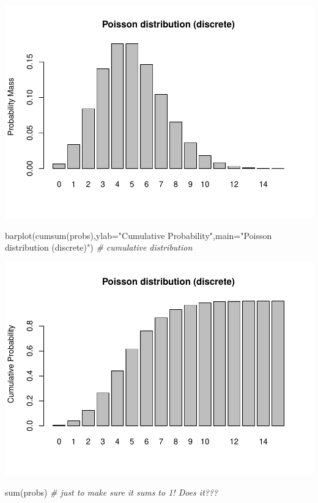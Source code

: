\documentclass[
]{article}
\newenvironment{Shaded}{\begin{snugshade}}{\end{snugshade}}
\newcommand{\AttributeTok}[1]{\textcolor[rgb]{0.77,0.63,0.00}{#1}}
\newcommand{\CommentTok}[1]{\textcolor[rgb]{0.56,0.35,0.01}{\textit{#1}}}
\newcommand{\FunctionTok}[1]{\textcolor[rgb]{0.00,0.00,0.00}{#1}}
\newcommand{\NormalTok}[1]{#1}
\newcommand{\StringTok}[1]{\textcolor[rgb]{0.31,0.60,0.02}{#1}}
\begin{document}
\includegraphics{LECTURE2_files/figure-latex/unnamed-chunk-13-1.pdf}

\begin{Shaded}
\begin{Highlighting}[]
\FunctionTok{barplot}\NormalTok{(}\FunctionTok{cumsum}\NormalTok{(probs),}\AttributeTok{ylab=}\StringTok{"Cumulative Probability"}\NormalTok{,}\AttributeTok{main=}\StringTok{"Poisson distribution (discrete)"}\NormalTok{)   }\CommentTok{\# cumulative distribution}
\end{Highlighting}
\end{Shaded}

\includegraphics{LECTURE2_files/figure-latex/unnamed-chunk-13-2.pdf}

\begin{Shaded}
\begin{Highlighting}[]
\FunctionTok{sum}\NormalTok{(probs)   }\CommentTok{\# just to make sure it sums to 1!  Does it???}
\end{Highlighting}
\end{Shaded}
\end{document}
